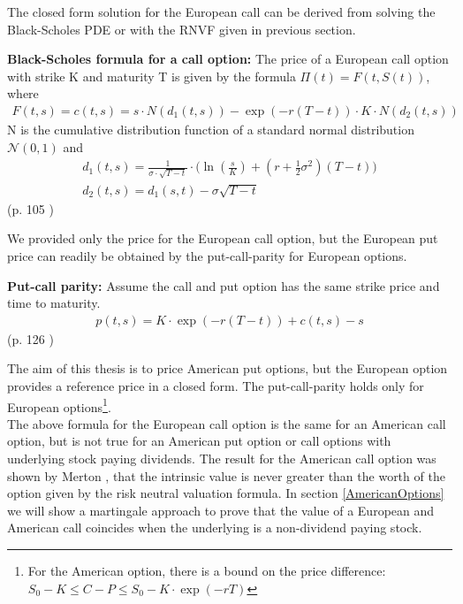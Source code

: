 The closed form solution for the European call can be derived from solving the Black-Scholes PDE or with the RNVF given in previous section. 
\theoremstyle{proposition}
\begin{proposition}{}\label{BS-price-EuroCall}
\textbf{Black-Scholes formula for a call option: } The price of a European call option with strike K and maturity T is given by the formula  $\Pi(t)=F(t,S(t))$, where
\begin{align*}
F(t,s)=c(t,s)=s \cdot N(d_1(t,s)) - \exp(-r(T-t)) \cdot K \cdot N(d_2(t,s))
\end{align*}
N is the cumulative distribution function of a standard normal distribution $\mathcal{N}(0,1)$ and
\begin{align*}
d_1(t,s)=\frac{1}{\sigma\cdot \sqrt{T-t}} \cdot \bigg( \ln(\frac{s}{K}) + (r+\frac{1}{2} \sigma^2) (T-t) \bigg)\\
d_2(t,s)=d_1(s,t)-\sigma \sqrt{T-t}
\end{align*}
\null \hfill (p. 105 \parencite{finKont})
\end{proposition}
We provided only the price for the European call option, but the European put price can readily be obtained by the put-call-parity for European options.

\theoremstyle{proposition}
\begin{proposition}{}\label{put-call-parity}
\textbf{Put-call parity: } 
Assume the call and put option has the same strike price and time to maturity.
\begin{align*}
p(t,s)=K\cdot \exp(-r(T-t))+c(t,s)-s
\end{align*}
\null \hfill (p. 126 \parencite{finKont})
\end{proposition}

The aim of this thesis is to price American put options, but the European option provides a reference price in a closed form. The put-call-parity holds only for European options\footnote{For the American option, there is a bound on the price difference: $S_0 - K \leq C-P \leq S_0 - K \cdot \exp(-rT)$}. \\

The above formula for the European call option is the same for an American call option, but is not true for an American put option or call options with underlying stock paying dividends. The result for the American call option was shown by Merton \parencite{Merton73}, that the intrinsic value is never greater than the worth of the option given by the risk neutral valuation formula. In section \ref{AmericanOptions} we will show a martingale approach to prove that the value of a European and American call coincides when the underlying is a non-dividend paying stock.

